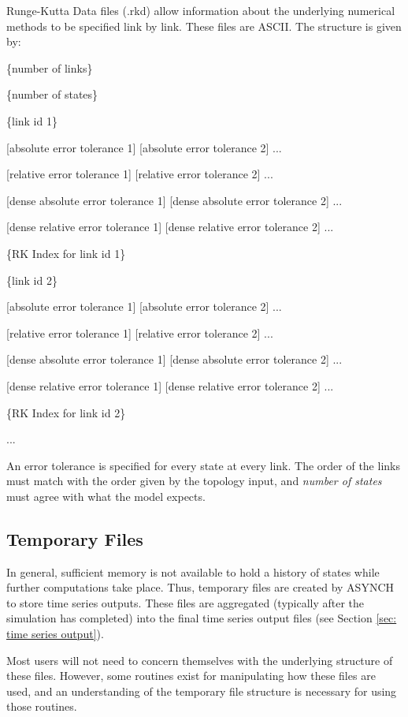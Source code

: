 \documentclass[12pt]{article}
\newenvironment{codeindent}
{\begin{list}{}
        {\setlength{\leftmargin}{.1in}}
        \item[]
}
{\end{list}}
\begin{document}
Runge-Kutta Data files (.rkd) allow information about the underlying numerical methods to be specified link by link. These files are ASCII. The structure is given by:
\begin{codeindent}
 \{number of links\}
 
 \{number of states\}
 
 \{link id 1\}
 
 {[}absolute error tolerance 1{]} {[}absolute error tolerance 2{]} ...

 {[}relative error tolerance 1{]} {[}relative error tolerance 2{]} ...

 {[}dense absolute error tolerance 1{]} {[}dense absolute error tolerance 2{]} ...

 {[}dense relative error tolerance 1{]} {[}dense relative error tolerance 2{]} ...
 
 \{RK Index for link id 1\}
 
 \{link id 2\}
 
 {[}absolute error tolerance 1{]} {[}absolute error tolerance 2{]} ...

 {[}relative error tolerance 1{]} {[}relative error tolerance 2{]} ...

 {[}dense absolute error tolerance 1{]} {[}dense absolute error tolerance 2{]} ...

 {[}dense relative error tolerance 1{]} {[}dense relative error tolerance 2{]} ...
 
 \{RK Index for link id 2\}
 
 ...
\end{codeindent}
An error tolerance is specified for every state at every link. The order of the links must match with the order given by the topology input, and \emph{number of states} must agree with what the model expects.


\subsection{Temporary Files} \label{sec: temporary files}

In general, sufficient memory is not available to hold a history of states while further computations take place. Thus, temporary files are created by ASYNCH to store time series outputs. These files are aggregated (typically after the simulation has completed) into the final time series output files (see Section \ref{sec: time series output}).

Most users will not need to concern themselves with the underlying structure of these files. However, some routines exist for manipulating how these files are used, and an understanding of the temporary file structure is necessary for using those routines.
\end{document}
